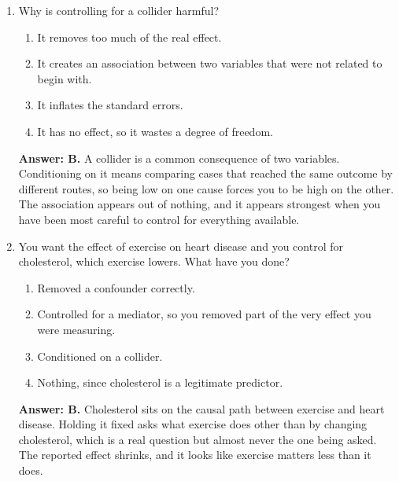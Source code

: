 \documentclass[11pt]{article}
\begin{document}
\begin{enumerate}[itemsep=14pt]
\vspace{2pt}
\textbf{Answer: B.} This is the classic case and the one most people already have in mind. Income affects both whether someone buys organic food and how healthy they are, so a raw comparison of organic buyers to everyone else is partly a comparison of richer people to poorer ones. Controlling for it removes that distortion.
\vspace{4pt}

\item Why is controlling for a collider harmful?

\begin{enumerate}[label=\Alph*., itemsep=1pt, topsep=3pt]
  \item It removes too much of the real effect.
  \item It creates an association between two variables that were not related to begin with.
  \item It inflates the standard errors.
  \item It has no effect, so it wastes a degree of freedom.
\end{enumerate}

\vspace{2pt}
\textbf{Answer: B.} A collider is a common consequence of two variables. Conditioning on it means comparing cases that reached the same outcome by different routes, so being low on one cause forces you to be high on the other. The association appears out of nothing, and it appears strongest when you have been most careful to control for everything available.
\vspace{4pt}

\item You want the effect of exercise on heart disease and you control for cholesterol, which exercise lowers. What have you done?

\begin{enumerate}[label=\Alph*., itemsep=1pt, topsep=3pt]
  \item Removed a confounder correctly.
  \item Controlled for a mediator, so you removed part of the very effect you were measuring.
  \item Conditioned on a collider.
  \item Nothing, since cholesterol is a legitimate predictor.
\end{enumerate}

\vspace{2pt}
\textbf{Answer: B.} Cholesterol sits on the causal path between exercise and heart disease. Holding it fixed asks what exercise does other than by changing cholesterol, which is a real question but almost never the one being asked. The reported effect shrinks, and it looks like exercise matters less than it does.
\vspace{4pt}


\end{enumerate}
\end{document}

